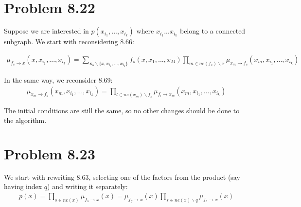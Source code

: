 \documentclass[fleqn]{article}
\begin{document}

\section*{Problem 8.22}

Suppose we are interested in $p(x_{i_1},...,x_{i_k})$ where $x_{i_1}...x_{i_k}$ belong to a connected subgraph.
We start with reconsidering 8.66:

\begin{align}
	\mu_{f_s\to x}(x, x_{i_1},...,x_{i_k}) = \sum\limits_{\boldsymbol{x_s} \backslash \{x, x_{i_1},...,x_{i_k}\}}f_s(x, x_1, ..., x_M)\prod\limits_{m \in ne(f_s) \backslash x}\mu_{x_m\to f_s}(x_m, x_{i_1},...,x_{i_k})
\end{align}

In the same way, we reconsider 8.69:
\begin{align}
	\mu_{x_m\to f_s}(x_m, x_{i_1},...,x_{i_k}) = \prod\limits_{l \in ne(x_m) \backslash f_s}\mu_{f_l\to x_m}(x_m, x_{i_1},...,x_{i_k})
\end{align}

The initial conditions are still the same, so no other changes should be done to the algorithm.

\section*{Problem 8.23}

We start with rewriting 8.63, selecting one of the factors from the product (say having index $q$) and writing it separately:
\begin{align}
	p(x) = \prod\limits_{s \in ne(x)} \mu_{f_s\to x} (x) =  \mu_{f_q\to x} (x) \prod\limits_{s \in ne(x) \backslash q} \mu_{f_s\to x} (x) 
\end{align}
\end{document}
